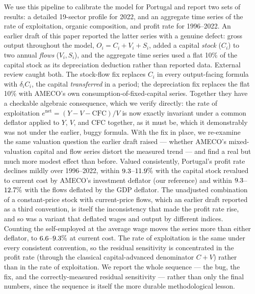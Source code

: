 \documentclass[11pt]{article}
\begin{document}
We use this pipeline to calibrate the model for Portugal and report two
sets of results: a detailed 19-sector profile for 2022, and an aggregate
time series of the rate of exploitation, organic composition, and profit
rate for 1996--2022. An earlier draft of this paper reported the latter
series with a genuine defect: gross output throughout the model,
$O_i=C_i+V_i+S_i$, added a capital \emph{stock} ($C_i$) to two annual
\emph{flows} ($V_i,S_i$), and the aggregate time series used a flat 10\%
of the capital stock as its depreciation deduction rather than reported
data. External review caught both. The stock-flow fix replaces $C_i$ in
every output-facing formula with $\delta_iC_i$, the capital
\emph{transferred} in a period; the depreciation fix replaces the flat
10\% with AMECO's own consumption-of-fixed-capital series. Together they
have a checkable algebraic consequence, which we verify directly: the
rate of exploitation $e^{\text{net}}=(Y-V-\text{CFC})/V$ is now exactly
invariant under a common deflator applied to $Y$, $V$, and CFC together,
as it must be, which it demonstrably was
not under the earlier, buggy formula. With the fix in place, we
re-examine the same valuation question the earlier draft raised ---
whether AMECO's mixed-valuation capital and flow series distort the
measured trend --- and find a real but much more modest effect than
before. Valued consistently, Portugal's profit rate declines mildly over
1996--2022, within $9.3$--$11.9\%$ with the capital
stock revalued to current cost by AMECO's investment deflator (our
reference) and within $9.3$--$12.7\%$ with the
flows deflated by the GDP deflator. The unadjusted combination of a
constant-price stock with current-price flows, which an earlier draft
reported as a third convention, is itself the inconsistency that made
the profit rate rise, and so was a variant that deflated wages and output
by different indices. Counting the self-employed at the average wage
moves the series more than either deflator, to
$6.6$--$9.3\%$ at current cost. The rate of
exploitation is the same under every consistent convention, so the
residual sensitivity is concentrated in the profit rate (through the
classical capital-advanced denominator $C+V$) rather than in the rate of
exploitation. We report the whole sequence --- the bug, the fix, and the
correctly-measured residual sensitivity --- rather than only the final
numbers, since the sequence is itself the more durable methodological
lesson.
\end{document}
